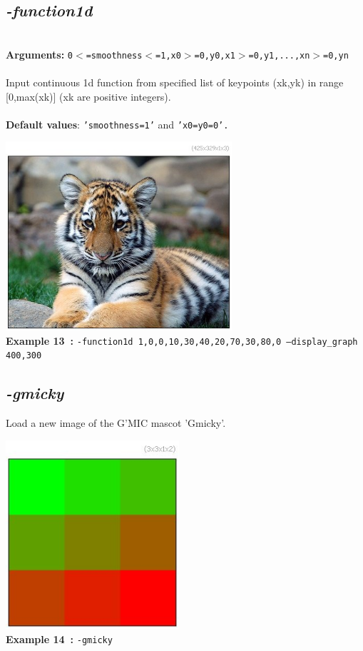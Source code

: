 \documentclass[a4paper,11pt,twoside]{book}
\begin{document}
\subsection{\emph{-function1d} }\vspace*{-0.5em}
~\\\textbf{Arguments: } 
{\small \texttt{0$<$=smoothness$<$=1,x0$>$=0,y0,x1$>$=0,y1,...,xn$>$=0,yn}}\\~\\
Input continuous 1d function from specified list of keypoints (xk,yk)
in range [0,max(xk)] (xk are positive integers).
~\\~\\\textbf{Default values}: {\small \texttt{'smoothness=1'} and \texttt{'x0=y0=0'.}}
\begin{center}\includegraphics[keepaspectratio=true,height=7cm,width=\textwidth]{img/gmic_def13.jpg}\\
{\footnotesize \textbf{Example 13~:} \texttt{-function1d 1,0,0,10,30,40,20,70,30,80,0 --display\_graph 400,300}}
\end{center}

\subsection{\emph{-gmicky} }\vspace*{-0.5em}
Load a new image of the G'MIC mascot 'Gmicky'.
\begin{center}\includegraphics[keepaspectratio=true,height=7cm,width=\textwidth]{img/gmic_def14.jpg}\\
{\footnotesize \textbf{Example 14~:} \texttt{-gmicky}}
\end{center}
\end{document}
